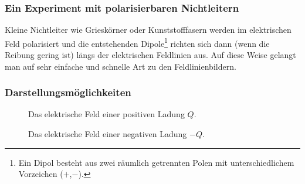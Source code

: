 \documentclass[11pt,twoside=false,open=any]{scrbook}
\begin{document}
\subsubsection{Ein Experiment mit polarisierbaren Nichtleitern}
Kleine Nichtleiter wie Grieskörner oder Kunststofffasern werden im elektrischen Feld polarisiert und die entstehenden Dipole\footnote{Ein Dipol besteht aus zwei räumlich getrennten Polen mit unterschiedlichem Vorzeichen ($+$,$-$).} richten sich dann (wenn die Reibung gering ist) längs der elektrischen Feldlinien aus. Auf diese Weise gelangt man auf sehr einfache und schnelle Art zu den Feldlinienbildern.

\begin{center}
   \setlength{\fboxrule}{2pt}
\end{center}

\subsubsection{Darstellungsmöglichkeiten}
\begin{figure}[h]
\begin{center}
\caption{Das elektrische Feld einer positiven Ladung $Q$.}
\label{Efeld +Q}
\end{center}
\end{figure}

\begin{figure}[h]
\begin{center}
\caption{Das elektrische Feld einer negativen Ladung $-Q$.}
\label{Efeld -Q}
\end{center}
\end{figure}
\end{document}
